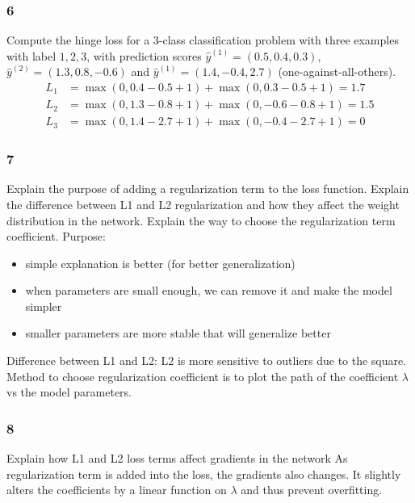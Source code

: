 \documentclass{article}
\begin{document}
\subsubsection*{6}
\begin{myleftlinebox}
    Compute the hinge loss for a 3-class classification problem with three examples with label \(1,2,3\), with prediction scores \(\hat y^{(1)}=(0.5,0.4,0.3)\), \(\hat y^{(2)}=(1.3,0.8,-0.6)\) and \(\hat y^{(1)}=(1.4,-0.4,2.7)\) (one-against-all-others).
    \tcblower
    \begin{align*}
        L_1 &= \max(0,0.4-0.5+1)+\max(0,0.3-0.5+1)=1.7\\
        L_2 &= \max(0,1.3-0.8+1)+\max(0,-0.6-0.8+1)=1.5\\
        L_3 &= \max(0,1.4-2.7+1)+\max(0,-0.4-2.7+1)=0
    \end{align*}
\end{myleftlinebox}

\subsubsection*{7}
\begin{myleftlinebox}
    Explain the purpose of adding a regularization term to the loss function. Explain the difference between L1 and L2 regularization and how they affect the weight distribution in the network. Explain the way to choose the regularization term coefficient.
    \tcblower
    Purpose:
    \begin{itemize}
        \item simple explanation is better (for better generalization)
        \item when parameters are small enough, we can remove it and make the model simpler
        \item smaller parameters are more stable that will generalize better
    \end{itemize}
    Difference between L1 and L2: L2 is more sensitive to outliers due to the square. Method to choose regularization coefficient is to plot the path of the coefficient \(\lambda\) vs the model parameters.
\end{myleftlinebox}

\subsubsection*{8}
\begin{myleftlinebox}
    Explain how L1 and L2 loss terms affect gradients in the network
    \tcblower
    As regularization term is added into the loss, the gradients also changes. It slightly alters the coefficients by a linear function on \(\lambda\) and thus prevent overfitting.
\end{myleftlinebox}
\end{document}
